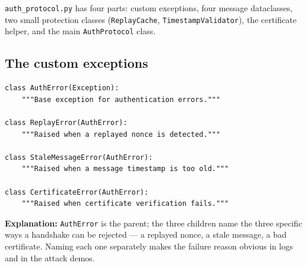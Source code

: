 \documentclass[11pt,a4paper]{article}
\begin{document}
\texttt{auth\_protocol.py} has four parts: custom exceptions, four message
dataclasses, two small protection classes (\texttt{ReplayCache},
\texttt{TimestampValidator}), the certificate helper, and the main
\texttt{AuthProtocol} class.

\subsection{The custom exceptions}
\begin{lstlisting}[style=py,caption={auth\_protocol.py --- the exception hierarchy.}]
class AuthError(Exception):
    """Base exception for authentication errors."""

class ReplayError(AuthError):
    """Raised when a replayed nonce is detected."""

class StaleMessageError(AuthError):
    """Raised when a message timestamp is too old."""

class CertificateError(AuthError):
    """Raised when certificate verification fails."""
\end{lstlisting}
\textbf{Explanation:} \texttt{AuthError} is the parent; the three children name
the three specific ways a handshake can be rejected --- a replayed nonce, a stale
message, a bad certificate. Naming each one separately makes the failure reason
obvious in logs and in the attack demos.
\end{document}
